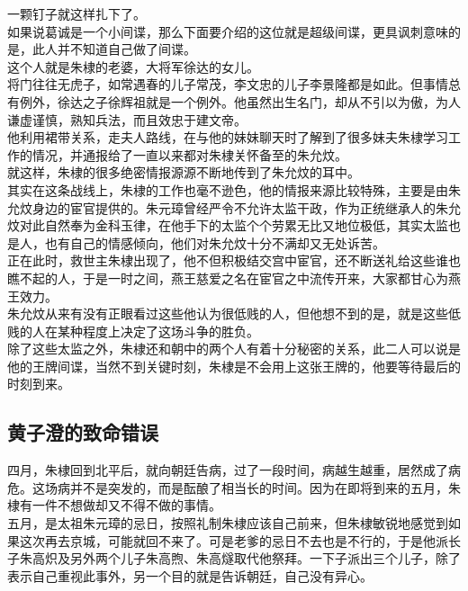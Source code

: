 \begin{multicols}{\theparacolNo}
一颗钉子就这样扎下了。\\

如果说葛诚是一个小间谍，那么下面要介绍的这位就是超级间谍，更具讽刺意味的是，此人并不知道自己做了间谍。\\

这个人就是朱棣的老婆，大将军徐达的女儿。\\

将门往往无虎子，如常遇春的儿子常茂，李文忠的儿子李景隆都是如此。但事情总有例外，徐达之子徐辉祖就是一个例外。他虽然出生名门，却从不引以为傲，为人谦虚谨慎，熟知兵法，而且效忠于建文帝。\\

他利用裙带关系，走夫人路线，在与他的妹妹聊天时了解到了很多妹夫朱棣学习工作的情况，并通报给了一直以来都对朱棣关怀备至的朱允炆。\\

就这样，朱棣的很多绝密情报源源不断地传到了朱允炆的耳中。\\

其实在这条战线上，朱棣的工作也毫不逊色，他的情报来源比较特殊，主要是由朱允炆身边的宦官提供的。朱元璋曾经严令不允许太监干政，作为正统继承人的朱允炆对此自然奉为金科玉律，在他手下的太监个个劳累无比又地位极低，其实太监也是人，也有自己的情感倾向，他们对朱允炆十分不满却又无处诉苦。\\

正在此时，救世主朱棣出现了，他不但积极结交宫中宦官，还不断送礼给这些谁也瞧不起的人，于是一时之间，燕王慈爱之名在宦官之中流传开来，大家都甘心为燕王效力。\\

朱允炆从来有没有正眼看过这些他认为很低贱的人，但他想不到的是，就是这些低贱的人在某种程度上决定了这场斗争的胜负。\\

除了这些太监之外，朱棣还和朝中的两个人有着十分秘密的关系，此二人可以说是他的王牌间谍，当然不到关键时刻，朱棣是不会用上这张王牌的，他要等待最后的时刻到来。\\

\subsection{黄子澄的致命错误}
四月，朱棣回到北平后，就向朝廷告病，过了一段时间，病越生越重，居然成了病危。这场病并不是突发的，而是酝酿了相当长的时间。因为在即将到来的五月，朱棣有一件不想做却又不得不做的事情。\\

五月，是太祖朱元璋的忌日，按照礼制朱棣应该自己前来，但朱棣敏锐地感觉到如果这次再去京城，可能就回不来了。可是老爹的忌日不去也是不行的，于是他派长子朱高炽及另外两个儿子朱高煦、朱高燧取代他祭拜。一下子派出三个儿子，除了表示自己重视此事外，另一个目的就是告诉朝廷，自己没有异心。\\


\end{multicols}
